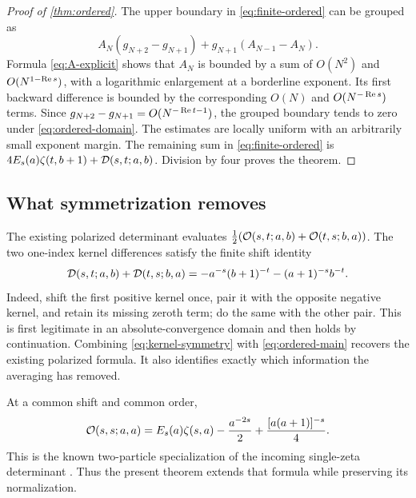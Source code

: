 \begin{proof}[Proof of \cref{thm:ordered}]
The upper boundary in \eqref{eq:finite-ordered} can be grouped as
\[
 A_N(g_{N+2}-g_{N+1})+g_{N+1}(A_{N-1}-A_N).
\]
Formula \eqref{eq:A-explicit} shows that $A_N$ is bounded by a sum
of $O(N^2)$ and $O(N^{1-\operatorname{Re} s})$, with a logarithmic enlargement
at a borderline exponent. Its first backward difference is bounded
by the corresponding $O(N)$ and $O(N^{-\operatorname{Re} s})$ terms.
Since $g_{N+2}-g_{N+1}=O(N^{-\operatorname{Re} t-1})$, the grouped boundary
tends to zero under \eqref{eq:ordered-domain}. The estimates are
locally uniform with an arbitrarily small exponent margin.
The remaining sum in \eqref{eq:finite-ordered} is
$4E_s(a)\zeta(t,b+1)+\mathcal D(s,t;a,b)$.
Division by four proves the theorem.
\end{proof}

\subsection{What symmetrization removes}

The existing polarized determinant evaluates
$\tfrac12(\mathcal O(s,t;a,b)+\mathcal O(t,s;b,a))$.
The two one-index kernel differences satisfy the finite shift identity
\begin{equation}\label{eq:kernel-symmetry}
 \mathcal D(s,t;a,b)+\mathcal D(t,s;b,a)
 =-a^{-s}(b+1)^{-t}-(a+1)^{-s}b^{-t}.
\end{equation}
Indeed, shift the first positive kernel once, pair it with the
opposite negative kernel, and retain its missing zeroth term;
do the same with the other pair. This is first legitimate in an
absolute-convergence domain and then holds by continuation.
Combining \eqref{eq:kernel-symmetry} with \eqref{eq:ordered-main}
recovers the existing polarized formula. It also identifies exactly
which information the averaging has removed.

At a common shift and common order,
\begin{equation}\label{eq:diagonal-recovery}
 \mathcal O(s,s;a,a)=E_s(a)\zeta(s,a)
                  -\frac{a^{-2s}}2+
                     \frac{[a(a+1)]^{-s}}4.
\end{equation}
This is the known two-particle specialization of the incoming
single-zeta determinant \cite{repo:finite}. Thus the present theorem
extends that formula while preserving its normalization.
